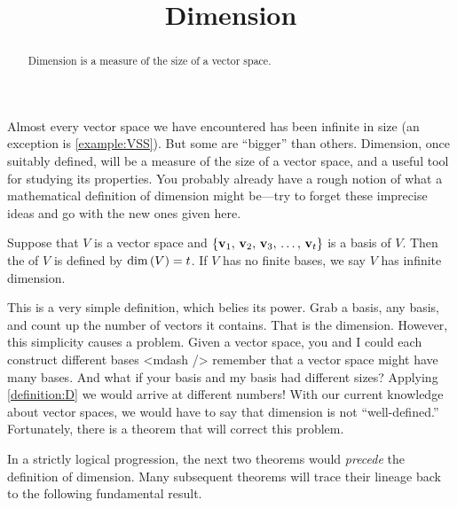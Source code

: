 \documentclass{ximera}
\title{Dimension}
\begin{document}
\begin{abstract}
  Dimension is a measure of the size of a vector space.
\end{abstract}
\maketitle

Almost every vector space we have encountered has been infinite in
size (an exception is \ref{example:VSS}).  But some are ``bigger''
than others.  Dimension, once suitably defined, will be a measure of
the size of a vector space, and a useful tool for studying its
properties.  You probably already have a rough notion of what a
mathematical definition of dimension might be---try to forget these
imprecise ideas and go with the new ones given here.

\begin{definition}[Dimension]\label{definition:D}
  Suppose that $V$ is a vector space and $\left\{\mathbf{v}_{1},\,\mathbf{v}_{2},\,\mathbf{v}_{3},\,\ldots,\,\mathbf{v}_{t}\right\}$ is
  a basis of $V$.  Then the  of $V$ is defined by
  $\dim\left(V\right)=t$.  If $V$ has no finite bases, we say $V$ has
  infinite dimension.
\end{definition}

This is a very simple definition, which belies its power.  Grab a
basis, any basis, and count up the number of vectors it contains.
That is the dimension.  However, this simplicity causes a problem.
Given a vector space, you and I could each construct different bases
<mdash /> remember that a vector space might have many bases.  And
what if your basis and my basis had different sizes?  Applying
\ref{definition:D} we would arrive at different numbers!  With our
current knowledge about vector spaces, we would have to say that
dimension is not ``well-defined.''  Fortunately, there is a theorem
that will correct this problem.

In a strictly logical progression, the next two theorems would
\textit{precede} the definition of dimension.  Many subsequent
theorems will trace their lineage back to the following fundamental
result.
\end{document}
